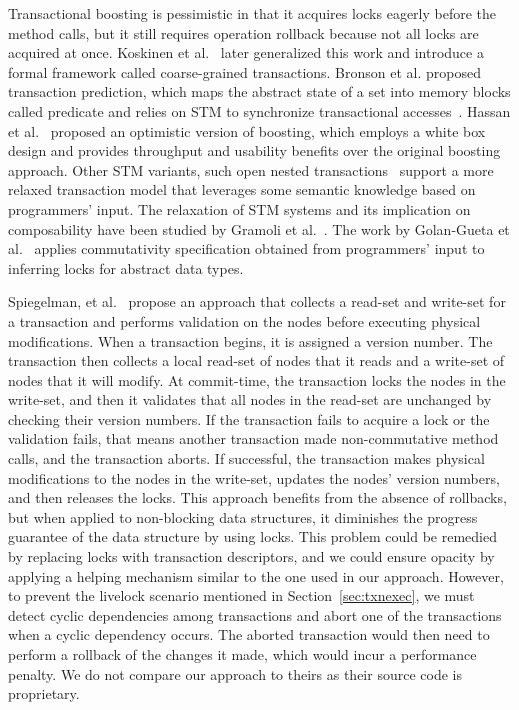 \documentclass{sig-alternate-05-2015}
\begin{document}
Transactional boosting is pessimistic in that it acquires locks eagerly before the method calls, but it still requires operation rollback because not all locks are acquired at once.
Koskinen et al.~\cite{koskinen2010coarse} later generalized this work and introduce a formal framework called coarse-grained transactions.
Bronson et al. proposed transaction prediction, which maps the abstract state of a set into memory blocks called predicate and relies on STM to synchronize transactional accesses~\cite{bronson2010transactional}.
Hassan et al.~\cite{hassan2014developing} proposed an optimistic version of boosting, which employs a white box design and provides throughput and usability benefits over the original boosting approach.
Other STM variants, such open nested transactions~\cite{ni2007open} support a more relaxed transaction model that leverages some semantic knowledge based on programmers' input.
The relaxation of STM systems and its implication on composability have been studied by Gramoli et al.~\cite{gramoli2013composing}.
The work by Golan-Gueta et al.~\cite{golan2015automatic} applies commutativity specification obtained from programmers' input to inferring locks for abstract data types.

Spiegelman, et al.~\cite{spiegelman2016transactional} propose an approach that collects a read-set and write-set for a transaction and performs validation on the nodes before executing physical modifications.
When a transaction begins, it is assigned a version number.
The transaction then collects a local read-set of nodes that it reads and a write-set of nodes that it will modify.
At commit-time, the transaction locks the nodes in the write-set, and then it validates that all nodes in the read-set are unchanged by checking their version numbers.
If the transaction fails to acquire a lock or the validation fails, that means another transaction made non-commutative method calls, and the transaction aborts.
If successful, the transaction makes physical modifications to the nodes in the write-set, updates the nodes' version numbers, and then releases the locks.
This approach benefits from the absence of rollbacks, but when applied to non-blocking data structures, it diminishes the progress guarantee of the data structure by using locks.
This problem could be remedied by replacing locks with transaction descriptors, and we could ensure opacity by applying a helping mechanism similar to the one used in our approach.
However, to prevent the livelock scenario mentioned in Section~\ref{sec:txnexec}, we must detect cyclic dependencies among transactions and abort one of the transactions when a cyclic dependency occurs.
The aborted transaction would then need to perform a rollback of the changes it made, which would incur a performance penalty.
We do not compare our approach to theirs as their source code is proprietary.
\end{document}
